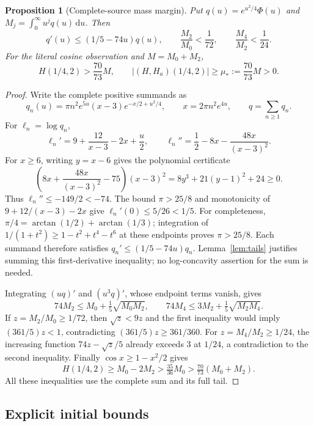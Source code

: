 \documentclass[11pt]{article}
\numberwithin{equation}{section}
\newtheorem{proposition}[theorem]{Proposition}
\newcommand{\dd}{\,\mathrm d}
\begin{document}
\begin{proposition}[Complete-source mass margin]\label{prop:thetamargin}
Put $q(u)=e^{u^2/4}\Phi(u)$ and $M_j=\int_0^\infty u^jq(u)\dd u$.
Then
\begin{equation}\label{eq:thetaslope}
 q'(u)\le(1/5-74u)q(u),\qquad
 \frac{M_2}{M_0}<\frac1{72},\qquad
 \frac{M_4}{M_2}<\frac1{24}.
\end{equation}
For the literal cosine observation and $M=M_0+M_2$,
\begin{equation}\label{eq:thetamassmargin}
 H(1/4,2)>\frac{70}{73}M,\qquad
 |(H,H_a)(1/4,2)|\ge\mu_*:=\frac{70}{73}M>0.
\end{equation}
\end{proposition}
\begin{proof}
Write the complete positive summands as
\[
 q_n(u)=\pi n^2e^{5u}(x-3)e^{-x/2+u^2/4},
 \qquad x=2\pi n^2e^{4u},\qquad q=\sum_{n\ge1}q_n.
\]
For $\ell_n=\log q_n$,
\[
 \ell_n'=9+\frac{12}{x-3}-2x+\frac u2,\qquad
 \ell_n''=\frac12-8x-\frac{48x}{(x-3)^2}.
\]
For $x\ge6$, writing $y=x-6$ gives the polynomial certificate
\[
 \left(8x+\frac{48x}{(x-3)^2}-75\right)(x-3)^2
       =8y^3+21(y-1)^2+24\ge0.
\]
Thus $\ell_n''\le-149/2<-74$. The bound $\pi>25/8$ and monotonicity
of $9+12/(x-3)-2x$ give $\ell_n'(0)\le5/26<1/5$.
For completeness, $\pi/4=\arctan(1/2)+\arctan(1/3)$; integration of
$1/(1+t^2)\ge1-t^2+t^4-t^6$ at these endpoints proves $\pi>25/8$.
Each summand therefore satisfies $q_n'\le(1/5-74u)q_n$.
Lemma~\ref{lem:tails} justifies summing this first-derivative inequality;
no log-concavity assertion for the sum is needed.

Integrating $(uq)'$ and $(u^3q)'$, whose endpoint terms vanish, gives
\[
 74M_2\le M_0+\tfrac15\sqrt{M_0M_2},\qquad
 74M_4\le3M_2+\tfrac15\sqrt{M_2M_4}.
\]
If $z=M_2/M_0\ge1/72$, then $\sqrt z<9z$ and the first inequality
would imply $(361/5)z<1$, contradicting $(361/5)z\ge361/360$.
For $z=M_4/M_2\ge1/24$, the increasing function
$74z-\sqrt z/5$ already exceeds $3$ at $1/24$, a contradiction
to the second inequality.
Finally $\cos x\ge1-x^2/2$ gives
\[
 H(1/4,2)\ge M_0-2M_2>\tfrac{35}{36}M_0>
                         \tfrac{70}{73}(M_0+M_2).
\]
All these inequalities use the complete sum and its full tail.
\end{proof}

\subsection{Explicit initial bounds}
\end{document}

